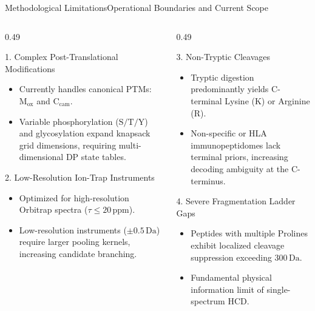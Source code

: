 \documentclass[aspectratio=169, 10pt]{beamer}
\begin{document}
\begin{frame}{Methodological Limitations}{Operational Boundaries and Current Scope}
\begin{columns}[T]
\begin{column}{0.49\textwidth}
  \begin{alertblock}{\scriptsize 1. Complex Post-Translational Modifications}
    \begin{itemize}\setlength{\itemsep}{1pt}\tiny
      \item Currently handles canonical PTMs: $\text{M}_{\text{ox}}$ and $\text{C}_{\text{cam}}$.
      \item Variable phosphorylation ($\text{S/T/Y}$) and glycosylation expand knapsack grid dimensions, requiring multi-dimensional DP state tables.
    \end{itemize}
  \end{alertblock}
  \vspace{0.05cm}
  \begin{alertblock}{\scriptsize 2. Low-Resolution Ion-Trap Instruments}
    \begin{itemize}\setlength{\itemsep}{1pt}\tiny
      \item Optimized for high-resolution Orbitrap spectra ($\tau \le 20\,\text{ppm}$).
      \item Low-resolution instruments ($\pm 0.5\,\text{Da}$) require larger pooling kernels, increasing candidate branching.
    \end{itemize}
  \end{alertblock}
\end{column}

\begin{column}{0.49\textwidth}
  \begin{alertblock}{\scriptsize 3. Non-Tryptic Cleavages}
    \begin{itemize}\setlength{\itemsep}{1pt}\tiny
      \item Tryptic digestion predominantly yields C-terminal Lysine (K) or Arginine (R).
      \item Non-specific or HLA immunopeptidomes lack terminal priors, increasing decoding ambiguity at the C-terminus.
    \end{itemize}
  \end{alertblock}
  \vspace{0.05cm}
  \begin{alertblock}{\scriptsize 4. Severe Fragmentation Ladder Gaps}
    \begin{itemize}\setlength{\itemsep}{1pt}\tiny
      \item Peptides with multiple Prolines exhibit localized cleavage suppression exceeding $300\,\text{Da}$.
      \item Fundamental physical information limit of single-spectrum HCD.
    \end{itemize}
  \end{alertblock}
\end{column}
\end{columns}
\end{frame}
\end{document}
